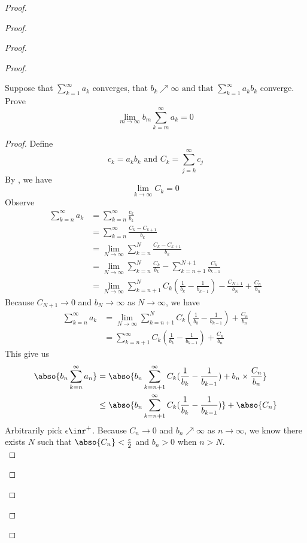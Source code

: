 \documentclass{report}
\begin{document}
\begin{proof}
\begin{proof}
\begin{proof}
\begin{proof}
\begin{question}{}{}
Suppose that $\sum_{k=1}^{\infty} a_k $ converges, that $b_k \nearrow \infty \text{ and that }\sum_{k=1}^{\infty} a_k b_k $
converge. Prove
\begin{equation*}
\lim_{m\to\infty}b_m\sum_{k=m}^\infty a_k=0
\end{equation*}
\end{question}
\begin{proof}
Define
\begin{equation*}
c_k=a_kb_k\text{ and }C_k=\sum_{j=k}^\infty c_j
\end{equation*}
By , we have
\begin{equation*}
\lim_{k\to\infty}C_k=0
\end{equation*}
Observe
\begin{align*}
  \sum_{k=n}^\infty a_k&=\sum_{k= n}^\infty \frac{c_k}{b_k}\\
  &=\sum_{k=n}^\infty \frac{C_k-C_{k+1}}{b_k}\\
  &=\lim_{N\to\infty}\sum^N_{k=n} \frac{C_k-C_{k+1}}{b_k}\\
  &=\lim_{N\to\infty}\sum_{k=n}^N \frac{C_k}{b_k}-\sum_{k=n+1}^{N+1}\frac{C_k}{b_{k-1}}\\
  &=\lim_{N\to\infty} \sum_{k=n+1}^{N} C_k(\frac{1}{b_k}-\frac{1}{b_{k-1}})-\frac{C_{N+1}}{b_N}+\frac{C_n}{b_n}
\end{align*}
Because $C_{N+1}\to 0$ and $b_N\to \infty$ as $N\to\infty$, we have
\begin{align*}
\sum_{k=n}^\infty a_k&=\lim_{N\to\infty}\sum_{k=n+1}^N C_k(\frac{1}{b_k}-\frac{1}{b_{k-1}})+\frac{C_n}{b_n}\\
&=\sum_{k=n+1}^\infty C_k(\frac{1}{b_k}-\frac{1}{b_{k-1}})+\frac{C_n}{b_n}
\end{align*}
This give us
\begin{align*}
\abso{b_n\sum_{k=n}^\infty a_n}&=\abso{b_n \sum_{k=n+1}^\infty C_k(\frac{1}{b_k}-\frac{1}{b_{k-1}})+b_n\times \frac{C_n}{b_n}}\\
&\leq \abso{b_n\sum_{k=n+1}^\infty C_k (\frac{1}{b_k}-\frac{1}{b_{k-1}})}+\abso{C_n}
\end{align*}
Arbitrarily pick $\epsilon \inr^+$. Because $C_n\to 0$ and $b_n\nearrow \infty$ as $n\to\infty$, we know there exists $N$ such that  $\abso{C_n}<\frac{\epsilon}{2}$  and $b_n>0$ when $n>N$.\\


\end{proof}
\end{proof}
\end{proof}
\end{proof}
\end{proof}
\end{document}
